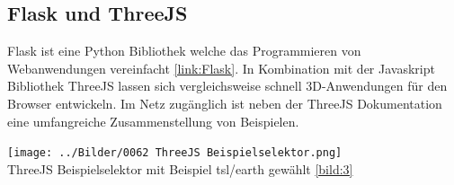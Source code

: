 \subsection{Flask und ThreeJS}
Flask ist eine Python Bibliothek welche das Programmieren von Webanwendungen vereinfacht \ref{link:Flask}. In Kombination mit der Javaskript Bibliothek ThreeJS lassen sich vergleichsweise schnell 3D-Anwendungen für den Browser entwickeln. Im Netz zugänglich ist neben der ThreeJS Dokumentation eine umfangreiche Zusammenstellung von Beispielen.
\begin{center}
	\texttt{[image: ../Bilder/0062 ThreeJS Beispielselektor.png]}{\\ThreeJS Beispielselektor mit Beispiel tsl/earth gewählt \ref{bild:3}}
\end{center}
